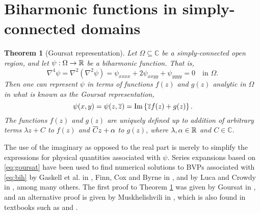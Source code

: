 \newtheorem{theorem}{Theorem}

\section{Biharmonic functions in simply-connected domains}

\begin{theorem}[Goursat representation]
\label{th:goursat}
Let $\Omega\subseteq\mathbb{C}$ be a simply-connected open region, and let $\psi : \Omega \to \mathbb{R}$ be a biharmonic function. That is,
\begin{equation}\label{eq:bih}
\nabla^4 \psi = \nabla^2 \left(\nabla^2 \psi\right) = \psi_{xxxx} +2 \psi_{xxyy} + \psi_{yyyy}= 0 \quad \text{in } \Omega.
\end{equation}
Then one can represent $\psi$ in terms of functions $f(z)$ and $g(z)$ analytic in $\Omega$ in what is known as the Goursat representation,
\begin{equation}\label{eq:goursat}
\psi(x,y) = \psi(z,{\overline{z}}) = \Im \left\{ {\overline{z}}f(z) + g(z)\right\}.
\end{equation}
The functions $f(z)$ and $g(z)$ are uniquely defined up to addition of arbitrary terms $\lambda z+C$ to $f(z)$ and ${\overline{C}}z+\alpha$ to $g(z)$, where $\lambda,\alpha\in\mathbb{R}$ and $C\in\mathbb{C}$.
\end{theorem}
The use of the imaginary as opposed to the real part is merely to simplify the expressions for physical quantities associated with $\psi$. Series expansions based on \eqref{eq:goursat} have been used to find numerical solutions to BVPs associated with \eqref{eq:bih} by Gaskell et al. in \cite{Gaskell98}, Finn, Cox and Byrne in \cite{FinnCoxByrne03}, and by Luca and Crowdy in \cite{Luca18}, among many others. The first proof to Theorem \ref{th:goursat} was given by Goursat in \cite{Gou98}, and an alternative proof is given by Muskhelishvili in \cite{Mus19}, which is also found in textbooks such as \cite{ckp66} and \cite{Mus77}.

